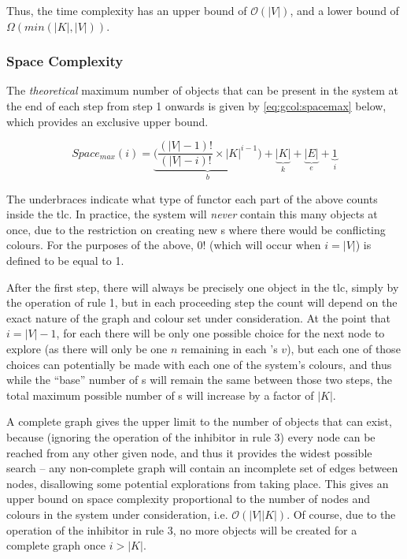 Thus, the time complexity has an upper bound of \(\mathcal{O}(|V|)\), and a lower bound of \(\Omega(min(|K|, |V|))\).

\subsubsection{Space Complexity}

The \emph{theoretical} maximum number of objects that can be present in the system at the end of each step from step 1 onwards is given by \cref{eq:gcol:spacemax} below, which provides an exclusive upper bound.

\begin{equation}\label{eq:gcol:spacemax}
    Space_{max}(i) = \underbrace{\bigg(\frac{(|V| - 1)!}{(|V| - i)!} \times |K|^{i-1}\bigg)}_{b} + \underbrace{|K|}_{k} + \underbrace{|E|}_{e} + \underbrace{1}_{i}
\end{equation}

The underbraces indicate what type of functor each part of the above counts inside the \gls{tlc}.  In practice, the system will \emph{never} contain this many objects at once, due to the restriction on creating new \bo{}s where there would be conflicting colours.  For the purposes of the above, \(0!\) (which will occur when \(i = |V|\)) is defined to be equal to 1.

After the first step, there will always be precisely one \bo{} object in the \gls{tlc}, simply by the operation of rule 1, but in each proceeding step the count will depend on the exact nature of the graph and colour set under consideration.  At the point that \(i = |V| - 1\), for each \bo{} there will be only one possible choice for the next node to explore (as there will only be one \(n\) remaining in each \bo{}'s \(v\)), but each one of those choices can potentially be made with each one of the system's colours, and thus while the ``base'' number of \bo{}s will remain the same between those two steps, the total maximum possible number of \bo{}s will increase by a factor of \(|K|\).

A complete graph gives the upper limit to the number of objects that can exist, because (ignoring the operation of the inhibitor in rule 3) every node can be reached from any other given node, and thus it provides the widest possible search -- any non-complete graph will contain an incomplete set of edges between nodes, disallowing some potential explorations from taking place.  This gives an upper bound on space complexity proportional to the number of nodes and colours in the system under consideration, i.e. \(\mathcal{O}(|V||K|)\).  Of course, due to the operation of the inhibitor in rule 3, no more \bo{} objects will be created for a complete graph once \(i > |K|\).

